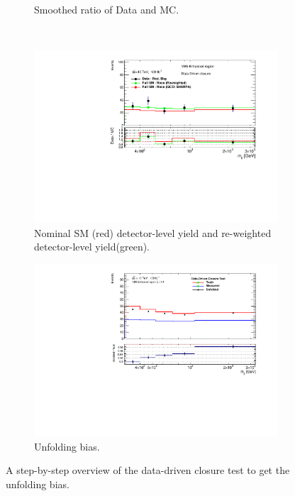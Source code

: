 \begin{figure}[htb]
\begin{subfigure}{.49\textwidth}
        \caption{Smoothed ratio of Data and MC. \label{fig:ddclosure_DataMCSmooth} }
    \end{subfigure}\\
    \begin{subfigure}{.49\textwidth}
        \centering
        \includegraphics[width=.9\linewidth]{figures/Analysis/Unfolding/DDClosure_VBS_Enhanced_Reweighted.pdf}
        \caption{ Nominal SM (red) detector-level yield and re-weighted detector-level yield(green). \label{fig:ddclosure_DataMCReweighted} }
    \end{subfigure}
    \begin{subfigure}{.49\textwidth}
        \centering
        \includegraphics[width=.9\linewidth]{figures/Analysis/Unfolding/DDClosure_VBS_Enhanced_Bias.pdf}
        \caption{Unfolding bias. \label{fig:ddclosure_FinalBias} }
    \end{subfigure}
    \caption{ A step-by-step overview of the data-driven closure test to get the unfolding bias. \label{fig:unfolding_ddclosure}}
\end{figure}

